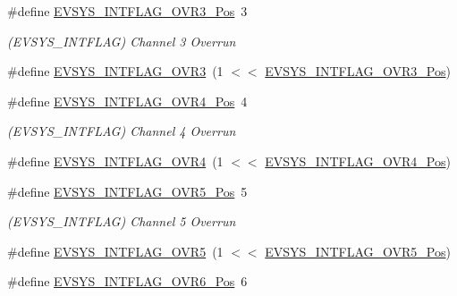 \begin{DoxyCompactItemize}
\item 
\#define \mbox{\hyperlink{group___s_a_m_d21___e_v_s_y_s_gaed357abedf732af9a5a4d1085f061f68}{E\+V\+S\+Y\+S\+\_\+\+I\+N\+T\+F\+L\+A\+G\+\_\+\+O\+V\+R3\+\_\+\+Pos}}~3
\begin{DoxyCompactList}\small\item\em (E\+V\+S\+Y\+S\+\_\+\+I\+N\+T\+F\+L\+AG) Channel 3 Overrun \end{DoxyCompactList}\item 
\#define \mbox{\hyperlink{group___s_a_m_d21___e_v_s_y_s_gaeb1dd5f9f37881ebbd1232ed722d35e1}{E\+V\+S\+Y\+S\+\_\+\+I\+N\+T\+F\+L\+A\+G\+\_\+\+O\+V\+R3}}~(1 $<$$<$ \mbox{\hyperlink{group___s_a_m_d21___e_v_s_y_s_gaed357abedf732af9a5a4d1085f061f68}{E\+V\+S\+Y\+S\+\_\+\+I\+N\+T\+F\+L\+A\+G\+\_\+\+O\+V\+R3\+\_\+\+Pos}})
\item 
\#define \mbox{\hyperlink{group___s_a_m_d21___e_v_s_y_s_ga2162e5fe2433855fd02adf4ba780b521}{E\+V\+S\+Y\+S\+\_\+\+I\+N\+T\+F\+L\+A\+G\+\_\+\+O\+V\+R4\+\_\+\+Pos}}~4
\begin{DoxyCompactList}\small\item\em (E\+V\+S\+Y\+S\+\_\+\+I\+N\+T\+F\+L\+AG) Channel 4 Overrun \end{DoxyCompactList}\item 
\#define \mbox{\hyperlink{group___s_a_m_d21___e_v_s_y_s_ga2b520837a0247599997bef38dfc1b2aa}{E\+V\+S\+Y\+S\+\_\+\+I\+N\+T\+F\+L\+A\+G\+\_\+\+O\+V\+R4}}~(1 $<$$<$ \mbox{\hyperlink{group___s_a_m_d21___e_v_s_y_s_ga2162e5fe2433855fd02adf4ba780b521}{E\+V\+S\+Y\+S\+\_\+\+I\+N\+T\+F\+L\+A\+G\+\_\+\+O\+V\+R4\+\_\+\+Pos}})
\item 
\#define \mbox{\hyperlink{group___s_a_m_d21___e_v_s_y_s_ga5ed80049fc3d2faccd7419f1658475a9}{E\+V\+S\+Y\+S\+\_\+\+I\+N\+T\+F\+L\+A\+G\+\_\+\+O\+V\+R5\+\_\+\+Pos}}~5
\begin{DoxyCompactList}\small\item\em (E\+V\+S\+Y\+S\+\_\+\+I\+N\+T\+F\+L\+AG) Channel 5 Overrun \end{DoxyCompactList}\item 
\#define \mbox{\hyperlink{group___s_a_m_d21___e_v_s_y_s_gacb74a5e1e9f8302f4d303c85508c5948}{E\+V\+S\+Y\+S\+\_\+\+I\+N\+T\+F\+L\+A\+G\+\_\+\+O\+V\+R5}}~(1 $<$$<$ \mbox{\hyperlink{group___s_a_m_d21___e_v_s_y_s_ga5ed80049fc3d2faccd7419f1658475a9}{E\+V\+S\+Y\+S\+\_\+\+I\+N\+T\+F\+L\+A\+G\+\_\+\+O\+V\+R5\+\_\+\+Pos}})
\item 
\#define \mbox{\hyperlink{group___s_a_m_d21___e_v_s_y_s_ga53cf2fd2b08340e39f38eb02a7288668}{E\+V\+S\+Y\+S\+\_\+\+I\+N\+T\+F\+L\+A\+G\+\_\+\+O\+V\+R6\+\_\+\+Pos}}~6
$$
\end{DoxyCompactItemize}
